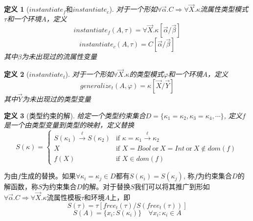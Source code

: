 \documentclass[12pt, titlepage]{article}
\newtheorem{definition}{定义}
\newcommand{\xto}{\xrightarrow}
\begin{document}
	\begin{definition}[$instantiate_f$和$instantiate_c$]
		对于一个形如$\forall\vec{\alpha}.C\Rightarrow\forall\vec{X}.\kappa$流属性类型模式$\tau$和一个环境$A$，定义$$instantiate_f(A, \tau) = \forall\vec{X}.\kappa[\vec{\alpha}/\vec{\beta}]$$$$instantiate_c(A, \tau)=C[\vec{\alpha}/\vec{\beta}]$$ 其中$\beta$为未出现过的流属性变量
	\end{definition}
	\begin{definition}[$instantiate_t$]
		对于一个形如$\forall\vec{X}.\kappa$的类型模式$\varphi$和一个环境$A$，定义$$generalize_t(A, \varphi) = \kappa[\vec{X}/\vec{Y}]$$ 其中$\vec{Y}$为未出现过的类型变量
	\end{definition}
	\begin{definition}[类型约束的解]
		给定一个类型约束集合$D = \{\kappa_1 = \kappa_2, \kappa_3 = \kappa_4, \cdots\}$, 定义$f$是一个由类型变量到类型的映射，定义替换
		\begin{equation*}
			S(\kappa) = 
			\begin{cases}
				S(\kappa_1)\xto{\ell}S(\kappa_2) & \text{if } \kappa = \kappa_1\xto{\ell}\kappa_2\\
				X & \text{if } X = Bool\ \text{or}\ X = Int\ \text{or}\ X\not\in dom(f)\\
				f(X) & \text{if } X\in dom(f)
			\end{cases}
		\end{equation*}
	\end{definition}
	为由$f$生成的替换。如果$\forall\kappa_i=\kappa_j\in D$都有$S(\kappa_i) = S(\kappa_j)$, 称$f$为约束集合$D$的解函数，称$S$为约束集合$D$的解。对于替换$S$我们可以将其推广到形如$\forall\vec{\alpha}.C\Rightarrow\forall\vec{X}.\kappa$流属性模板$\tau$和环境$A$上，即$$S(\tau) = \tau[free_t(\tau)/S(free_t(\tau))]$$$$S(A) = \{x_i:S(\kappa_i)\}\quad\forall x_i:\kappa_i\in A$$
	
\end{document}
